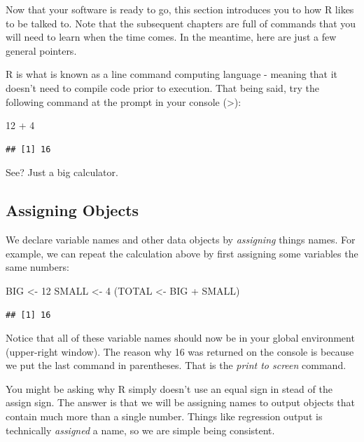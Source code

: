 \documentclass[
]{book}
\newenvironment{Shaded}{\begin{snugshade}}{\end{snugshade}}
\newcommand{\DecValTok}[1]{\textcolor[rgb]{0.00,0.00,0.81}{#1}}
\newcommand{\NormalTok}[1]{#1}
\newcommand{\OtherTok}[1]{\textcolor[rgb]{0.56,0.35,0.01}{#1}}
\newcommand{\SpecialCharTok}[1]{\textcolor[rgb]{0.00,0.00,0.00}{#1}}
\begin{document}
Now that your software is ready to go, this section introduces you to how R likes to be talked to. Note that the subsequent chapters are full of commands that you will need to learn when the time comes. In the meantime, here are just a few general pointers.

R is what is known as a line command computing language - meaning that it doesn't need to compile code prior to execution. That being said, try the following command at the prompt in your console (\textgreater):

\begin{Shaded}
\begin{Highlighting}[]
\DecValTok{12} \SpecialCharTok{+} \DecValTok{4}
\end{Highlighting}
\end{Shaded}

\begin{verbatim}
## [1] 16
\end{verbatim}

See? Just a big calculator.

\hypertarget{assigning-objects}{%
\subsection{Assigning Objects}\label{assigning-objects}}

We declare variable names and other data objects by \emph{assigning} things names. For example, we can repeat the calculation above by first assigning some variables the same numbers:

\begin{Shaded}
\begin{Highlighting}[]
\NormalTok{BIG }\OtherTok{\textless{}{-}} \DecValTok{12}
\NormalTok{SMALL }\OtherTok{\textless{}{-}} \DecValTok{4}
\NormalTok{(TOTAL }\OtherTok{\textless{}{-}}\NormalTok{ BIG }\SpecialCharTok{+}\NormalTok{ SMALL)}
\end{Highlighting}
\end{Shaded}

\begin{verbatim}
## [1] 16
\end{verbatim}

Notice that all of these variable names should now be in your global environment (upper-right window). The reason why 16 was returned on the console is because we put the last command in parentheses. That is the \emph{print to screen} command.

You might be asking why R simply doesn't use an equal sign in stead of the assign sign. The answer is that we will be assigning names to output objects that contain much more than a single number. Things like regression output is technically \emph{assigned} a name, so we are simple being consistent.
\end{document}
